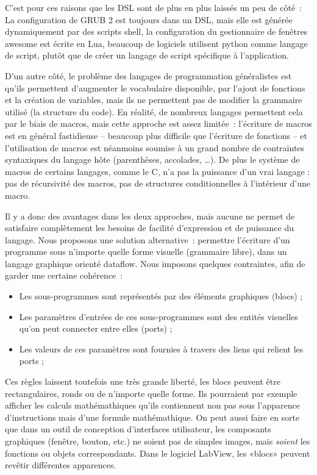 \documentclass{article}
\begin{document}
C'est pour ces raisons que les DSL sont de plus en plus laissés un peu de côté~: La configuration de GRUB 2 est toujours dans un DSL, mais
elle est générée dynamiquement par des scripts shell\cite{config-grub}, la configuration du gestionnaire de fenêtres awesome est écrite en
Lua\cite{config-awesome}, beaucoup de logiciels utilisent python comme langage de script, plutôt que de créer un langage de script
spécifique à l'application.

D'un autre côté, le problème des langages de programmation généralistes est qu'ils permettent d'augmenter le vocabulaire disponible, par
l'ajout de fonctions et la création de variables, mais ils ne permettent pas de modifier la grammaire utilisé (la structure du code). En
réalité, de nombreux langages permettent cela par le biais de macros, mais cette approche est assez limitée~: l'écriture de macros est en
général fastidieuse -- beaucoup plus difficile que l'écriture de fonctions -- et l'utilisation de macros est néanmoins soumise à un grand
nombre de contraintes syntaxiques du langage hôte (parenthèses, accolades, \dots). De plus le système de macros de certains langages, comme
le C, n'a pas la puissance d'un vrai langage : pas de récursivité des macros, pas de structures conditionnelles à l'intérieur d'une macro.

Il y a donc des avantages dans les deux approches, mais aucune ne permet de satisfaire complètement les besoins de facilité d'expression et
de puissance du langage. Nous proposons une solution alternative~: permettre l'écriture d'un programme sous n'importe quelle forme visuelle
(grammaire libre), dans un langage graphique orienté dataflow. Nous imposons quelques contraintes, afin de garder une certaine cohérence~:
\begin{itemize}
\item Les sous-programmes sont représentés par des éléments graphiques (blocs) ;
\item Les paramètres d'entrées de ces sous-programmes sont des entités visuelles qu'on peut connecter entre elles (ports) ;
\item Les valeurs de ces paramètres sont fournies à travers des liens qui relient les ports ;
\end{itemize}
Ces règles laissent toutefois une très grande liberté, les blocs peuvent être rectangulaires, ronds ou de n'importe quelle forme. Ils
pourraient par exemple afficher les calculs mathémathiques qu'ils contiennent non pas sous l'apparence d'instructions mais d'une formule
mathémathique. On peut aussi faire en sorte que dans un outil de conception d'interfaces utilisateur, les composants graphiques (fenêtre,
bouton, etc.) ne soient pas de simples images, mais \emph{soient} les fonctions ou objets correspondants. Dans le logiciel LabView, les
«blocs» peuvent revêtir différentes apparences.
\end{document}
